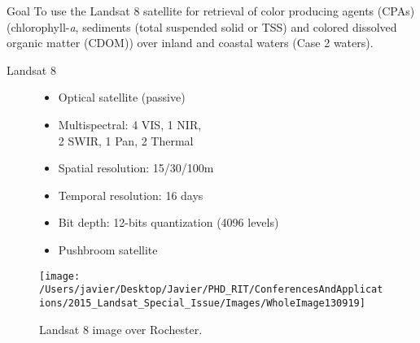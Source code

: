 \documentclass[mathserif]{beamer}
\begin{document}
\begin{frame}{}
\begin{columns}[t]
\begin{column}{.3\linewidth}
\begin{block}{Goal}
\justifying\small 
To use the Landsat 8 satellite for retrieval of color producing agents (CPAs) (chlorophyll-{\it a}, sediments (total suspended solid or TSS) and colored dissolved organic matter (CDOM)) over inland and coastal waters (Case 2 waters). 
\end{block}
\begin{block}{Landsat 8}
\begin{figure}[htb]
\begin{minipage}[c]{0.48\linewidth}
\small
\begin{itemize}
	\item Optical satellite (passive)
	\vspace{.2cm}
	\item Multispectral: 4 VIS, 1 NIR, \\2 SWIR, 1 Pan, 2 Thermal
	\vspace{.2cm}
	\item Spatial resolution: 15/30/100m
	\vspace{.2cm}
	\item Temporal resolution: 16 days
	\vspace{.2cm}
	\item Bit depth: 12-bits quantization (4096 levels)
	\vspace{.2cm}
	\item Pushbroom satellite
\end{itemize}
\end{minipage}
\hfill
\begin{minipage}[c]{0.48\linewidth}
  	\centering
  	\texttt{[image: /Users/javier/Desktop/Javier/PHD\_RIT/ConferencesAndApplications/2015\_Landsat\_Special\_Issue/Images/WholeImage130919]}
  \caption{Landsat 8 image over Rochester. \label{fig:Scene} } 
\end{minipage}
\end{figure}


\end{block}
\end{column}
\end{columns}
\end{frame}
\end{document}

